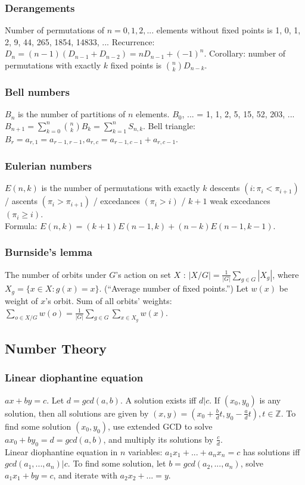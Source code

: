 \documentclass[a4paper,13pt]{article}
\begin{document}
\subsubsection{Derangements}
Number of permutations of $n = 0,1,2,...$ elements without fixed points is 1, 0, 1, 2, 9, 44, 265, 1854, 14833, ... Recurrence: $D_{n} = (n-1)(D_{n-1} + D_{n-2}) = nD_{n-1} + (-1)^{n}$.
Corollary: number of permutations with exactly $k$ fixed points is $\binom{n}{k}D_{n-k}$.

\subsubsection{Bell numbers}
$B_{n}$ is the number of partitions of $n$ elements. $B_0$, ... = 1, 1, 2, 5, 15, 52, 203, ...\\
$B_{n+1} = \sum_{k=0}^{n}\binom{n}{k}B_{k} = \sum_{k=1}^{n} S_{n,k}$. Bell triangle: $B_r = a_{r,1} = a_{r-1,r-1}, a_{r,c} = a_{r-1,c-1} + a_{r,c-1}$.

\subsubsection{Eulerian numbers}
$E(n, k)$ is the number of permutations with exactly $k$ descents $(i : \pi_{i} < \pi_{i+1})$ / ascents $(\pi_{i} > \pi_{i+1})$ / excedances $(\pi_{i} > i)$ / $k + 1$ weak excedances $(\pi_{i} \geq i)$.\\
Formula: $E(n,k) = (k+1)E(n-1,k) + (n-k)E(n-1,k-1)$.

\subsubsection{Burnside's lemma}
The number of orbits under $G$'s action on set $X$ : $|X/G| = \frac{1}{|G|} \sum_{g \in G} |X_g|$, where $X_g = \{x \in X : g(x) = x\}$. (``Average number of fixed points.'')
Let $w(x)$ be weight of $x$'s orbit. Sum of all orbits' weights: $\sum_{o \in X/G}w(o) = \frac{1}{|G|} \sum_{g \in G} \sum_{x \in X_g} w(x)$.

\subsection{Number Theory}
\subsubsection{Linear diophantine equation}
$ax + by = c$. Let $d = gcd(a,b)$. A solution exists iff $d|c$. If $(x_0, y_0)$ is any solution, then all solutions are given by $(x, y) = (x_0 + \frac{b}{d}t, y_0 - \frac{a}{d}t), t \in \mathbb{Z}$. To find some solution $(x_0, y_0)$,
use extended GCD to solve $ax_0 + by_0 = d = gcd(a, b)$, and multiply its solutions by $\frac{c}{d}$.\\
Linear diophantine equation in $n$ variables: $a_1x_1 + ... + a_nx_n = c$ has solutions iff $gcd(a_1, ..., a_n) | c$. To find some solution, let $b = gcd(a_2, ..., a_n)$, solve $a_1x_1 + by = c$, and iterate with $a_2x_2 + ... = y$.
\end{document}
